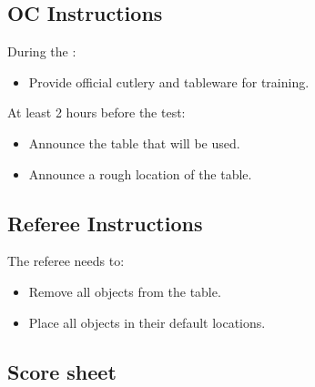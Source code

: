\subsection*{OC Instructions}

During the \SetupDays:
\begin{itemize}
	\item Provide official cutlery and tableware for training.
\end{itemize}

At least 2 hours before the test:
\begin{itemize}
	\item Announce the table that will be used.
	\item Announce a rough location of the table.
\end{itemize}


\subsection*{Referee Instructions}

The referee needs to:
\begin{itemize}
	\item Remove all objects from the table.
	\item Place all objects in their default locations.
\end{itemize}

\subsection*{Score sheet}


